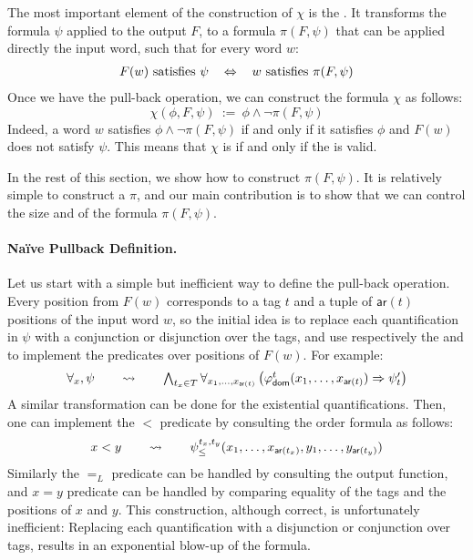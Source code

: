 The most important element of the construction of $\chi$ is the . 
It transforms the formula $\psi$ applied to the output $F$,
to a formula $\pi(F, \psi)$ that can be applied directly the input word, 
such that for every word $w$:
\[
\begin{tabular}{ccc}
    $F(w)$ satisfies $\psi$ & $\Leftrightarrow$ & $w$ satisfies $\pi(F, \psi)$
\end{tabular}
\]
Once we have the pull-back operation, we can construct the formula $\chi$ as follows:
\[ 
    \chi(\phi, F, \psi)\ :=\ \phi \wedge \neg \pi(F, \psi)
\]
Indeed, a word $w$ satisfies $\phi \wedge \neg \pi(F, \psi)$ if and only if
it satisfies $\phi$ and $F(w)$ does not satisfy $\psi$. This means that 
$\chi$ is  if and only if the  is valid.

In the rest of this section, we show how to construct $\pi(F, \psi)$. 
It is relatively simple to construct a 
$\pi$, and our main contribution is to show that
we can control the size and 
of the formula $\pi(F, \psi)$.

\paragraph{Naïve Pullback Definition.} Let us start 
with a simple but inefficient way to define the pull-back operation.
Every position from $F(w)$ corresponds to a tag $t$ and a tuple of $\mathsf{ar}(t)$ positions of the input word $w$, 
so the initial idea is to replace each quantification in $\psi$ with a conjunction or disjunction
over the tags,
and use respectively the 
and  to implement the
predicates over positions of $F(w)$.
For example: 
\[ 
\begin{tabular}{ccc}
    $\forall_{x}, \psi$ & $\quad \rightsquigarrow \quad$ & $\bigwedge_{t_x \in T} \forall_{x_1, \ldots, x_{\mathsf{ar}(t)}} \left( \varphi_{\mathsf{dom}}^t(x_1, \ldots, x_{\mathsf{ar}(t)}) \Rightarrow \psi'_{t} \right)$
\end{tabular}
\]
A similar transformation can be done for the existential
quantifications. Then, one can
implement the $<$ predicate by consulting the order formula 
as follows:
\[
\begin{tabular}{ccc}
    $x < y$ & $\quad \rightsquigarrow \quad$ & $\psi_{\leq}^{t_x, t_y}(x_1, \ldots, x_{\mathsf{ar}(t_x)}, y_1, \ldots, y_{\mathsf{ar}(t_y)})$
\end{tabular}
\]
Similarly the $=_L$ predicate can be handled by consulting the output function, and
$x = y$ predicate can be handled by comparing equality of the tags and the positions of $x$ and $y$. This construction, although correct, is unfortunately inefficient:  Replacing each quantification with a disjunction or conjunction
over tags, results in an exponential blow-up of the formula. 

